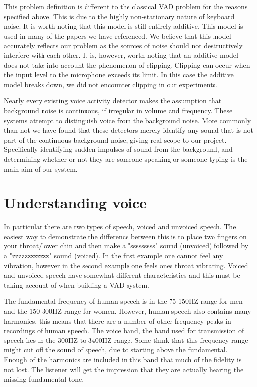 \documentclass[ %
                    author={Sam Phippen},
                supervisor={Dr. Rafal Bogacz},
                     title={Real time voice activity detectors in noisy personal computing environments},
                  subtitle={},
                    degree={MEng},
                      year={2012} ]{thesis}
\begin{document}
This problem definition is different to the classical VAD problem for the
reasons specified above. This is due to the highly non-stationary nature of
keyboard noise. It is worth noting that this model is still entirely additive.
This model is used in many of the papers we have referenced. We believe that
this model accurately reflects our problem as the sources of noise should not
destructively interfere with each other. It is, however, worth noting that an
additive model does not take into account the phenomenon of clipping. Clipping
can occur when the input level to the microphone exceeds its limit. In this
case the additive model breaks down, we did not encounter clipping in our
experiments.

Nearly every existing voice activity detector makes the assumption that
background noise is continuous, if irregular in volume and frequency. These
systems attempt to distinguish voice from the background noise. More commonly
than not we have found that these detectors merely identify any sound that is
not part of the continuous background noise, giving real scope to our project.
Specifically identifying sudden impulses of sound from the background, and
determining whether or not they are someone speaking or someone typing is the
main aim of our system.

\section{Understanding voice}

In particular there are two types of speech, voiced and unvoiced speech. The
easiest way to demonstrate the difference between this is to place two fingers
on your throat/lower chin and then make a "sssssssss" sound (unvoiced) followed
by a "zzzzzzzzzzzz" sound (voiced). In the first example one cannot feel any
vibration, however in the second example one feels ones throat vibrating.
Voiced and unvoiced speech have somewhat different characteristics and this
must be taking account of when building a VAD system\cite{atal}.

The fundamental frequency of human speech is in the 75-150HZ range for men and
the 150-300HZ range for women\cite{Traunmüller}. However, human speech also
contains many harmonics, this means that there are a number of other frequency
peaks in recordings of human speech. The voice band, the band used for
transmission of speech lies in the 300HZ to 3400HZ range. Some think that this
frequency range might cut off the sound of speech, due to starting above the
fundamental. Enough of the harmonics are included in this band that much of the
fidelity is not lost. The listener will get the impression that they are
actually hearing the missing fundamental tone.
\end{document}

